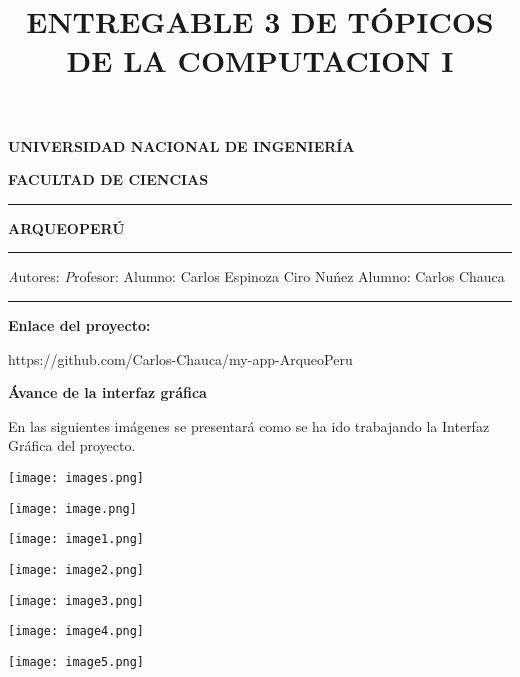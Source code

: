 \documentclass[12pt,a4paper]{report}
\title{ENTREGABLE 3 DE T\'OPICOS DE LA COMPUTACION I}
\begin{document}
\begin{center} 
\textbf{\Huge  UNIVERSIDAD NACIONAL DE INGENIER\'IA}
\end{center}
\begin{center} 
\textbf{\LARGE FACULTAD DE CIENCIAS}
\end{center}
\hfill \break
\rule[2mm]{160mm}{0.4mm}
\hfill \break
\begin{center} 
\textbf{\huge ARQUEOPER\'U}
\end{center}
\hfill \break
\hfill \break
\rule[2mm]{160mm}{0.4mm}
\hfill \break
\hfill \break
{\textit Autores:} \hspace{7cm} {\textit Profesor:}
\hfill \break
\hfill \break
{Alumno: Carlos Espinoza} \hspace{3,9cm} { Ciro Nu\'nez}
\hfill \break
{Alumno: Carlos Chauca}
\hfill \break
\hfill \break
\hfill \break
\hfill \break
\hfill \break
\hfill \break
\hfill \break
\hfill \break
\hfill \break
\hfill \break
\hfill \break
\hfill \break
\hfill \break
\rule[2mm]{160mm}{0.4mm}
\hfill \break
\hfill \break
\begin{center}
{\textbf{\LARGE Enlace del proyecto:}}
\end{center}
\begin{center}
https://github.com/Carlos-Chauca/my-app-ArqueoPeru
\end{center}
\newpage
\begin{center}
\textbf{\'Avance de la interfaz gr\'afica}
\end{center}
En las siguientes im\'agenes se presentar\'a como se ha ido trabajando la Interfaz Gr\'afica del proyecto.
\begin{center} 
\texttt{[image: images.png]}
\end{center}
\begin{center} 
\texttt{[image: image.png]}
\end{center}
\begin{center} 
\texttt{[image: image1.png]}
\end{center}
\hfill \break
\hfill \break
\begin{center} 
\texttt{[image: image2.png]}
\end{center}
\begin{center} 
\texttt{[image: image3.png]}
\end{center}
\hfill \break
\hfill \break
\begin{center} 
\texttt{[image: image4.png]}
\end{center}
\begin{center} 
\texttt{[image: image5.png]}
\end{center}
\hfill \break
\hfill \break
\end{document}
